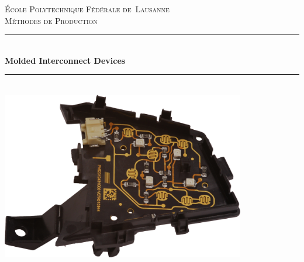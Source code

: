 \begin{titlepage}

\newcommand{\HRule}{\rule{\linewidth}{0.5mm}} %

\center %
\textsc{\LARGE École Polytechnique Fédérale de~Lausanne}\\[1.5cm] 
\textsc{\Large Méthodes de Production}\\[0.5cm] %

\HRule \\[0.4cm]
{ \huge \bfseries Molded Interconnect Devices}\\[0.4cm] %
\HRule \\[1.5cm]
 
\includegraphics[width=0.8\textwidth]{../images/mid_example}\\[2cm]



\end{titlepage}
